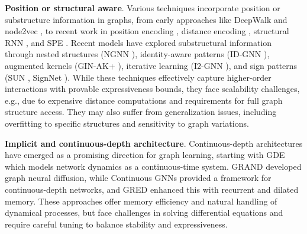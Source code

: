 {\bf{Position or structural aware}}. Various techniques incorporate position or substructure information in graphs, from early approaches like DeepWalk \cite{perozzi2014deepwalk} and node2vec \cite{grover2016node2vec}, to recent work in position encoding \cite{you2019position}, distance encoding \cite{li2020distance}, structural RNN \cite{jain2016structural}, and SPE \cite{huang2024stability}. Recent models have explored substructural information through nested structures (NGNN \cite{zhang2021nested}), identity-aware patterns (ID-GNN \cite{you2021identity}), augmented kernels (GIN-AK+ \cite{zhao2021stars}), iterative learning (I2-GNN \cite{huang2022boosting}), and sign patterns (SUN \cite{frasca2022understanding}, SignNet \cite{lim2022sign}). While these techniques effectively capture higher-order interactions with provable expressiveness bounds, they face scalability challenges, e.g., due to expensive distance computations and requirements for full graph structure access. They may also suffer from generalization issues, including overfitting to specific structures and sensitivity to graph variations.

{\bf{Implicit and continuous-depth architecture}}. Continuous-depth architectures have emerged as a promising direction for graph learning, starting with GDE \cite{poli2019graph} which models network dynamics as a continuous-time system. GRAND \cite{chamberlain2021grand} developed graph neural diffusion, while Continuous GNNs \cite{xhonneux2020continuous} provided a framework for continuous-depth networks, and GRED \cite{ding2024recurrent} enhanced this with recurrent and dilated memory. These approaches offer memory efficiency and natural handling of dynamical processes, but face challenges in solving differential equations and require careful tuning to balance stability and expressiveness.